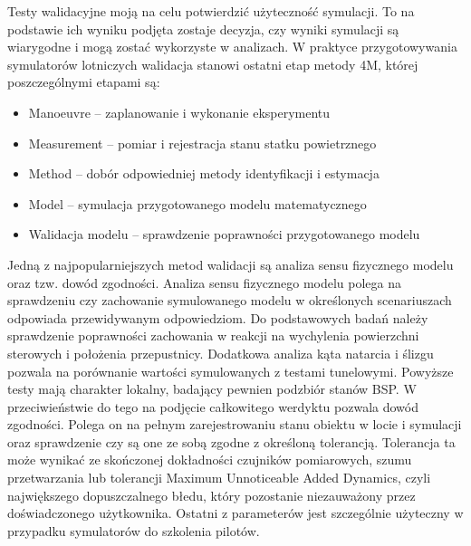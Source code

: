\documentclass[15pt]{sprawozdanie}
\begin{document}
Testy walidacyjne moją na celu potwierdzić użyteczność symulacji. To na podstawie ich wyniku podjęta zostaje decyzja, czy wyniki symulacji są wiarygodne i mogą zostać wykorzyste w analizach. W praktyce przygotowywania symulatorów lotniczych walidacja stanowi ostatni etap metody 4M, której poszczególnymi etapami są:
\begin{itemize}[noitemsep]
\item Manoeuvre -- zaplanowanie i wykonanie eksperymentu
\item Measurement -- pomiar i rejestracja stanu statku powietrznego
\item Method -- dobór odpowiedniej metody identyfikacji i estymacja
\item Model -- symulacja przygotowanego modelu matematycznego
\item Walidacja modelu -- sprawdzenie poprawności przygotowanego modelu
\end{itemize}

Jedną z najpopularniejszych metod walidacji są analiza sensu fizycznego modelu oraz tzw. dowód zgodności. Analiza sensu fizycznego modelu polega na sprawdzeniu czy zachowanie symulowanego modelu w określonych scenariuszach odpowiada przewidywanym odpowiedziom. Do podstawowych badań należy sprawdzenie poprawności zachowania w reakcji na wychylenia powierzchni sterowych i położenia przepustnicy. Dodatkowa analiza kąta natarcia i ślizgu pozwala na porównanie wartości symulowanych z testami tunelowymi. Powyższe testy mają charakter lokalny, badający pewnien podzbiór stanów BSP. W przeciwieństwie do tego na podjęcie całkowitego werdyktu pozwala dowód zgodności. Polega on na pełnym zarejestrowaniu stanu obiektu w locie i symulacji oraz sprawdzenie czy są one ze sobą zgodne z określoną tolerancją. Tolerancja ta może wynikać ze skończonej dokładności czujników pomiarowych, szumu przetwarzania lub tolerancji Maximum Unnoticeable Added Dynamics, czyli największego dopuszczalnego błedu, który pozostanie niezauważony przez doświadczonego użytkownika. Ostatni z parameterów jest szczególnie użyteczny w przypadku symulatorów do szkolenia pilotów.\\
\end{document}
